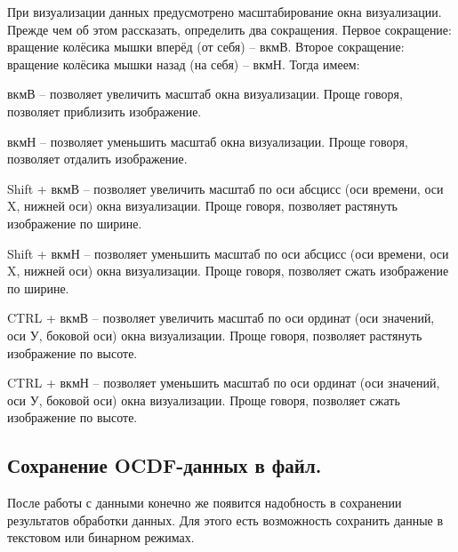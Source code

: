 {\standartFont

  \par При визуализации данных предусмотрено масштабирование окна визуализации. Прежде чем об этом рассказать, определить два сокращения. Первое сокращение: вращение колёсика мышки вперёд (от себя) {--} вкмВ. Второе сокращение: вращение колёсика мышки назад (на себя) {--} вкмН. Тогда имеем: 

  \par вкмВ {--} позволяет увеличить масштаб окна визуализации. Проще говоря, позволяет приблизить изображение. 

  \par вкмН {--} позволяет уменьшить масштаб окна визуализации. Проще говоря, позволяет отдалить изображение. 

  \par Shift + вкмВ {--} позволяет увеличить масштаб по оси абсцисс (оси времени, оси X, нижней оси) окна визуализации. Проще говоря, позволяет растянуть изображение по ширине. 

  \par Shift + вкмН {--} позволяет уменьшить масштаб по оси абсцисс (оси времени, оси X, нижней оси) окна визуализации. Проще говоря, позволяет сжать изображение по ширине.  

  \par CTRL + вкмВ {--} позволяет увеличить масштаб по оси ординат (оси значений, оси У, боковой оси) окна визуализации. Проще говоря, позволяет растянуть изображение по высоте. 

  \par CTRL + вкмН {--} позволяет уменьшить масштаб по оси ординат (оси значений, оси У, боковой оси) окна визуализации. Проще говоря, позволяет сжать изображение по высоте.  

  \par 
}

\subsection{ \standartTitleFont
  Сохранение OCDF-данных в файл.
} \label{subsubsec:OCDFSafe}

{\standartFont

  \par После работы с данными конечно же появится надобность в сохранении результатов обработки данных. Для этого есть возможность сохранить данные в текстовом или бинарном режимах. 

  \par 
}

